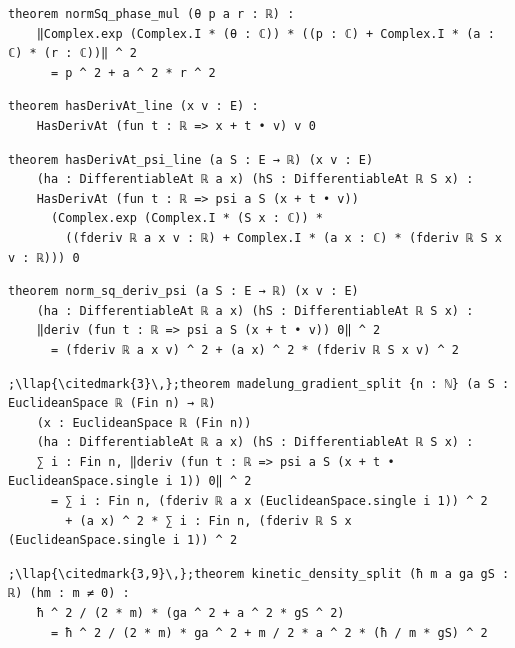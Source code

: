 \begin{lstlisting}[style=leancat]
theorem normSq_phase_mul (θ p a r : ℝ) :
    ‖Complex.exp (Complex.I * (θ : ℂ)) * ((p : ℂ) + Complex.I * (a : ℂ) * (r : ℂ))‖ ^ 2
      = p ^ 2 + a ^ 2 * r ^ 2
\end{lstlisting}

\begin{lstlisting}[style=leancat]
theorem hasDerivAt_line (x v : E) :
    HasDerivAt (fun t : ℝ => x + t • v) v 0
\end{lstlisting}

\begin{lstlisting}[style=leancat]
theorem hasDerivAt_psi_line (a S : E → ℝ) (x v : E)
    (ha : DifferentiableAt ℝ a x) (hS : DifferentiableAt ℝ S x) :
    HasDerivAt (fun t : ℝ => psi a S (x + t • v))
      (Complex.exp (Complex.I * (S x : ℂ)) *
        ((fderiv ℝ a x v : ℝ) + Complex.I * (a x : ℂ) * (fderiv ℝ S x v : ℝ))) 0
\end{lstlisting}

\begin{lstlisting}[style=leancat]
theorem norm_sq_deriv_psi (a S : E → ℝ) (x v : E)
    (ha : DifferentiableAt ℝ a x) (hS : DifferentiableAt ℝ S x) :
    ‖deriv (fun t : ℝ => psi a S (x + t • v)) 0‖ ^ 2
      = (fderiv ℝ a x v) ^ 2 + (a x) ^ 2 * (fderiv ℝ S x v) ^ 2
\end{lstlisting}

\begin{lstlisting}[style=leancat]
;\llap{\citedmark{3}\,};theorem madelung_gradient_split {n : ℕ} (a S : EuclideanSpace ℝ (Fin n) → ℝ)
    (x : EuclideanSpace ℝ (Fin n))
    (ha : DifferentiableAt ℝ a x) (hS : DifferentiableAt ℝ S x) :
    ∑ i : Fin n, ‖deriv (fun t : ℝ => psi a S (x + t • EuclideanSpace.single i 1)) 0‖ ^ 2
      = ∑ i : Fin n, (fderiv ℝ a x (EuclideanSpace.single i 1)) ^ 2
        + (a x) ^ 2 * ∑ i : Fin n, (fderiv ℝ S x (EuclideanSpace.single i 1)) ^ 2
\end{lstlisting}

\begin{lstlisting}[style=leancat]
;\llap{\citedmark{3,9}\,};theorem kinetic_density_split (ħ m a ga gS : ℝ) (hm : m ≠ 0) :
    ħ ^ 2 / (2 * m) * (ga ^ 2 + a ^ 2 * gS ^ 2)
      = ħ ^ 2 / (2 * m) * ga ^ 2 + m / 2 * a ^ 2 * (ħ / m * gS) ^ 2
\end{lstlisting}

